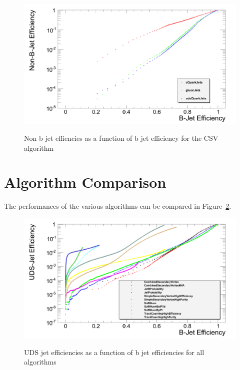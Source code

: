 \begin{figure}[hbtp]
   \centering
     \includegraphics[width=\textwidth]{Chapters/04_Analysis/04a_BTags/Images/CombinedSecondaryVertex_nonBJetEfficiency_v_BJetEfficiency}\\
     \caption{Non b jet effiencies as a function of b jet efficiency for the CSV algorithm}
     \label{fig:jet_efficiencies}
\end{figure}

\section{Algorithm Comparison}
\label{algorithm_comparison}

The performances of the various algorithms can be compared in Figure~\ref{fig:uds_eff_v_b_eff}.

\begin{figure}[hbtp]
   \centering
     \includegraphics[width=\textwidth]{Chapters/04_Analysis/04a_BTags/Images/UDS-JetEfficiency_v_B-JetEfficiency_withLegend}\\
     \caption{UDS jet efficiencies as a function of b jet efficiencies for all algorithms}
     \label{fig:uds_eff_v_b_eff}
\end{figure}

